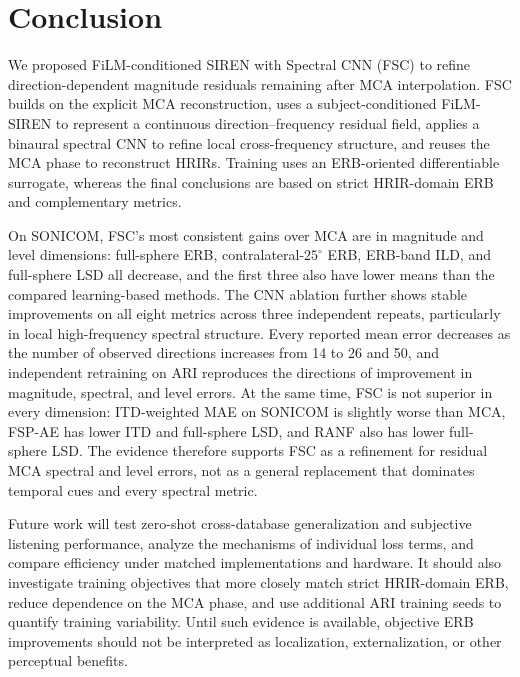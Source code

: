 \documentclass[UTF8,a4paper]{article}
\begin{document}
\section{Conclusion}
\label{sec:conclusion}

We proposed FiLM-conditioned SIREN with Spectral CNN (FSC) to refine direction-dependent magnitude residuals remaining after MCA interpolation. FSC builds on the explicit MCA reconstruction, uses a subject-conditioned FiLM-SIREN to represent a continuous direction--frequency residual field, applies a binaural spectral CNN to refine local cross-frequency structure, and reuses the MCA phase to reconstruct HRIRs. Training uses an ERB-oriented differentiable surrogate, whereas the final conclusions are based on strict HRIR-domain ERB and complementary metrics.

On SONICOM, FSC's most consistent gains over MCA are in magnitude and level dimensions: full-sphere ERB, contralateral-$25^\circ$ ERB, ERB-band ILD, and full-sphere LSD all decrease, and the first three also have lower means than the compared learning-based methods. The CNN ablation further shows stable improvements on all eight metrics across three independent repeats, particularly in local high-frequency spectral structure. Every reported mean error decreases as the number of observed directions increases from 14 to 26 and 50, and independent retraining on ARI reproduces the directions of improvement in magnitude, spectral, and level errors. At the same time, FSC is not superior in every dimension: ITD-weighted MAE on SONICOM is slightly worse than MCA, FSP-AE has lower ITD and full-sphere LSD, and RANF also has lower full-sphere LSD. The evidence therefore supports FSC as a refinement for residual MCA spectral and level errors, not as a general replacement that dominates temporal cues and every spectral metric.

Future work will test zero-shot cross-database generalization and subjective listening performance, analyze the mechanisms of individual loss terms, and compare efficiency under matched implementations and hardware. It should also investigate training objectives that more closely match strict HRIR-domain ERB, reduce dependence on the MCA phase, and use additional ARI training seeds to quantify training variability. Until such evidence is available, objective ERB improvements should not be interpreted as localization, externalization, or other perceptual benefits.



\end{document}
